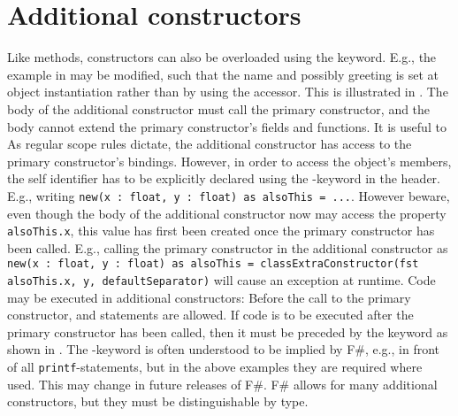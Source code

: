\section{Additional constructors}
Like methods, constructors can also be overloaded using the  keyword. E.g., the example in  may be modified, such that the name and possibly greeting is set at object instantiation rather than by using the accessor. This is illustrated in .
%
%
The body of the additional constructor must call the primary constructor, and the body cannot extend the primary constructor's fields and functions. It is useful to  As regular scope rules dictate, the additional constructor has access to the primary constructor's bindings. However, in order to access the object's members, the self identifier has to be explicitly declared using the -keyword in the header. E.g., writing \lstinline{new(x : float, y : float) as alsoThis = ...}. However beware, even though the body of the additional constructor now may access the property \lstinline{alsoThis.x}, this value has first been created once the primary constructor has been called. E.g., calling the primary constructor in the additional constructor as \lstinline{new(x : float, y : float) as alsoThis = classExtraConstructor(fst alsoThis.x, y, defaultSeparator)} will cause an exception at runtime. Code may be executed in additional constructors: Before the call to the primary constructor,  and  statements are allowed. If code is to be executed after the primary constructor has been called, then it must be preceded by the  keyword as shown in .
%
%
The -keyword is often understood to be implied by F\#, e.g., in front of all \lstinline{printf}-statements, but in the above examples they are required where used. This may change in future releases of F\#. F\# allows for many additional constructors, but they must be distinguishable by type.

